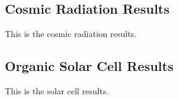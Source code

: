 \subsection{Cosmic Radiation Results}
\label{sec:Cosmic-Radiation-Results}

This is the cosmic radiation results.


\subsection{Organic Solar Cell Results}
\label{sec:Solar-Cell-Results}

This is the solar cell results.
